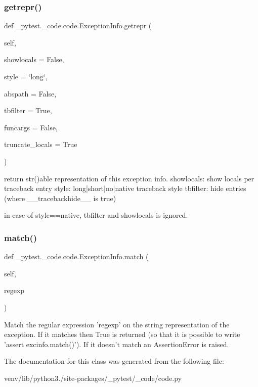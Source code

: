 \subsubsection{\texorpdfstring{getrepr()}{getrepr()}}
{\footnotesize\ttfamily def \+\_\+pytest.\+\_\+code.\+code.\+Exception\+Info.\+getrepr (\begin{DoxyParamCaption}\item[{}]{self,  }\item[{}]{showlocals = {\ttfamily False},  }\item[{}]{style = {\ttfamily \char`\"{}long\char`\"{}},  }\item[{}]{abspath = {\ttfamily False},  }\item[{}]{tbfilter = {\ttfamily True},  }\item[{}]{funcargs = {\ttfamily False},  }\item[{}]{truncate\+\_\+locals = {\ttfamily True} }\end{DoxyParamCaption})}

\begin{DoxyVerb}return str()able representation of this exception info.
    showlocals: show locals per traceback entry
    style: long|short|no|native traceback style
    tbfilter: hide entries (where __tracebackhide__ is true)

    in case of style==native, tbfilter and showlocals is ignored.
\end{DoxyVerb}
 \mbox{\label{class__pytest_1_1__code_1_1code_1_1_exception_info_a4f098c68872a17664de89b00ebac9190}} 
\subsubsection{\texorpdfstring{match()}{match()}}
{\footnotesize\ttfamily def \+\_\+pytest.\+\_\+code.\+code.\+Exception\+Info.\+match (\begin{DoxyParamCaption}\item[{}]{self,  }\item[{}]{regexp }\end{DoxyParamCaption})}

\begin{DoxyVerb}Match the regular expression 'regexp' on the string representation of
the exception. If it matches then True is returned (so that it is
possible to write 'assert excinfo.match()'). If it doesn't match an
AssertionError is raised.
\end{DoxyVerb}
 

The documentation for this class was generated from the following file\+:\begin{DoxyCompactItemize}
\item 
venv/lib/python3./site-\/packages/\+\_\+pytest/\+\_\+code/code.\+py\end{DoxyCompactItemize}
